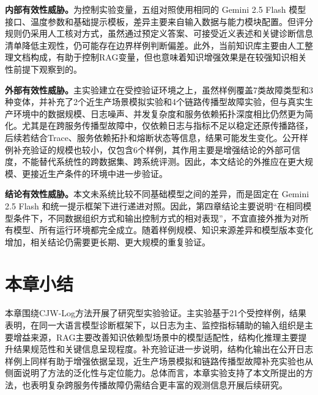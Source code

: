 \textbf{内部有效性威胁。}为控制实验变量，五组对照使用相同的 Gemini 2.5 Flash 模型接口、温度参数和基础提示模板，差异主要来自输入数据与能力模块配置。但评分规则仍采用人工核对方式，虽然通过预定义答案、可接受近义表述和关键诊断信息清单降低主观性，仍可能存在边界样例判断偏差。此外，当前知识库主要由人工整理文档构成，有助于控制RAG变量，但也意味着知识增强效果是在较强知识相关性前提下观察到的。

\textbf{外部有效性威胁。}主实验建立在受控验证环境之上，虽然样例覆盖7类故障类型和3种变体，并补充了2个近生产场景模拟实验和4个链路传播型故障实验，但与真实生产环境中的数据规模、日志噪声、并发复杂度和服务依赖拓扑深度相比仍然更为简化。尤其是在跨服务传播型故障中，仅依赖日志与指标不足以稳定还原传播路径，后续若结合Trace、服务依赖拓扑和熔断状态等信息，结果可能发生变化。公开样例补充验证的规模也较小，仅包含6个样例，其作用主要是增强结论的外部可信度，不能替代系统性的跨数据集、跨系统评测。因此，本文结论的外推应在更大规模、更接近生产条件的环境中进一步验证。

\textbf{结论有效性威胁。}本文未系统比较不同基础模型之间的差异，而是固定在 Gemini 2.5 Flash 和统一提示框架下进行递进对照。因此，第四章结论主要说明“在相同模型条件下，不同数据组织方式和输出控制方式的相对表现”，不宜直接外推为对所有模型、所有运行环境都完全成立。随着样例规模、知识来源差异和模型版本变化增加，相关结论仍需要更长期、更大规模的重复验证。

\section{本章小结}

本章围绕CJW-Log方法开展了研究型实验验证。主实验基于21个受控样例，结果表明，在同一大语言模型诊断框架下，以日志为主、监控指标辅助的输入组织是主要增益来源，RAG主要改善知识依赖型场景中的模型适配性，结构化推理主要提升结果规范性和关键信息呈现程度。补充验证进一步说明，结构化输出在公开日志样例上同样有助于增强依据呈现，近生产场景模拟和链路传播型故障补充实验也从侧面说明了方法的泛化性与定位能力。总体而言，本章实验支持了本文所提出的方法，也表明复杂跨服务传播故障仍需结合更丰富的观测信息开展后续研究。
